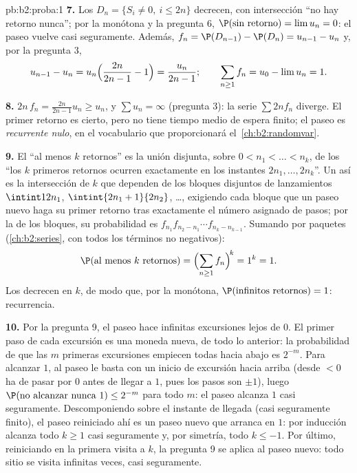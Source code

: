 \begin{solution}{pb:b2:proba:1}
\textbf{7.} Los  $D_n = \{S_i \neq 0,\ i \leq 2n\}$
decrecen, con intersección ``no hay retorno nunca''; por la
 monótona y la pregunta 6, $\P(\text{sin retorno}) = \lim
u_n = 0$: el paseo vuelve casi seguramente. Además, $f_n =
\P(D_{n-1}) - \P(D_n) = u_{n-1} - u_n$ y, por la pregunta 3,
\[
u_{n-1} - u_n = u_n\Bigl(\frac{2n}{2n-1} - 1\Bigr) =
\frac{u_n}{2n-1};
\qquad
\sum_{n\geq1}f_n = u_0 - \lim u_n = 1 .
\]

\textbf{8.} $2n\,f_n = \frac{2n}{2n-1}u_n \geq u_n$, y $\sum u_n =
\infty$ (pregunta 3): la serie $\sum 2nf_n$ diverge. El primer
retorno es cierto, pero no tiene tiempo medio de espera finito; el
paseo es \emph{recurrente nulo}, en el vocabulario que proporcionará
el~\cref{ch:b2:randomvar}.

\textbf{9.} El  ``al menos $k$ retornos'' es la unión
 disjunta, sobre $0 < n_1 < \dots < n_k$, de los 
``los $k$ primeros retornos ocurren exactamente en los instantes
$2n_1, \dots, 2n_k$''. Un  así es la intersección de $k$
 que dependen de los bloques disjuntos de lanzamientos
$\intint1{2n_1}$, $\intint{2n_1+1}{2n_2}$, \dots, exigiendo cada
bloque que un paseo nuevo haga su primer retorno tras exactamente el
número asignado de pasos; por la  de los bloques, su
probabilidad es $f_{n_1}f_{n_2-n_1}\cdots f_{n_k-n_{k-1}}$. Sumando
por paquetes (\cref{ch:b2:series}, con todos los términos no
negativos):
\[
\P(\text{al menos }k\text{ retornos})
= \Bigl(\sum_{n\geq1}f_n\Bigr)^{\!k} = 1^k = 1 .
\]
Los  decrecen en $k$, de modo que, por la 
monótona, $\P(\text{infinitos retornos}) = 1$: recurrencia.

\textbf{10.} Por la pregunta 9, el paseo hace infinitas excursiones
lejos de $0$. El primer paso de cada excursión es una moneda nueva,
 de todo lo anterior: la probabilidad de que las $m$
primeras excursiones empiecen todas hacia abajo es $2^{-m}$. Para
alcanzar $1$, al paseo le basta con un inicio de excursión hacia
arriba (desde $<0$ ha de pasar por $0$ antes de llegar a $1$, pues
los pasos son $\pm1$), luego $\P(\text{no alcanzar nunca }1) \leq
2^{-m}$ para todo $m$: el paseo alcanza $1$ casi seguramente.
Descomponiendo sobre el instante de llegada (casi seguramente
finito), el paseo reiniciado ahí es un paseo nuevo que arranca en
$1$: por inducción alcanza todo $k \geq 1$ casi seguramente y, por
simetría, todo $k \leq -1$. Por último, reiniciando en la primera
visita a $k$, la pregunta 9 se aplica al paseo nuevo: todo sitio se
visita infinitas veces, casi seguramente.


\end{solution}
